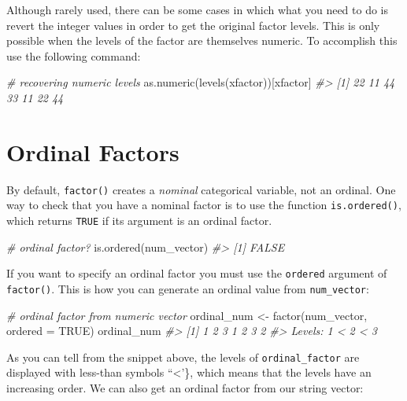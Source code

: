 \documentclass[
]{book}
\newenvironment{Shaded}{\begin{snugshade}}{\end{snugshade}}
\newcommand{\AttributeTok}[1]{\textcolor[rgb]{0.77,0.63,0.00}{#1}}
\newcommand{\CommentTok}[1]{\textcolor[rgb]{0.56,0.35,0.01}{\textit{#1}}}
\newcommand{\ConstantTok}[1]{\textcolor[rgb]{0.00,0.00,0.00}{#1}}
\newcommand{\FunctionTok}[1]{\textcolor[rgb]{0.00,0.00,0.00}{#1}}
\newcommand{\NormalTok}[1]{#1}
\newcommand{\OtherTok}[1]{\textcolor[rgb]{0.56,0.35,0.01}{#1}}
\begin{document}
Although rarely used, there can be some cases in which what you need to do is
revert the integer values in order to get the original factor levels. This is
only possible when the levels of the factor are themselves numeric. To accomplish
this use the following command:

\begin{Shaded}
\begin{Highlighting}[]
\CommentTok{\# recovering numeric levels}
\FunctionTok{as.numeric}\NormalTok{(}\FunctionTok{levels}\NormalTok{(xfactor))[xfactor]}
\CommentTok{\#\textgreater{} [1] 22 11 44 33 11 22 44}
\end{Highlighting}
\end{Shaded}

\hypertarget{ordinal-factors}{%
\section{Ordinal Factors}\label{ordinal-factors}}

By default, \texttt{factor()} creates a \emph{nominal} categorical variable, not an ordinal.
One way to check that you have a nominal factor is to use the function
\texttt{is.ordered()}, which returns \texttt{TRUE} if its argument is an ordinal factor.

\begin{Shaded}
\begin{Highlighting}[]
\CommentTok{\# ordinal factor?}
\FunctionTok{is.ordered}\NormalTok{(num\_vector)}
\CommentTok{\#\textgreater{} [1] FALSE}
\end{Highlighting}
\end{Shaded}

If you want to specify an ordinal factor you must use the \texttt{ordered} argument of
\texttt{factor()}. This is how you can generate an ordinal value from \texttt{num\_vector}:

\begin{Shaded}
\begin{Highlighting}[]
\CommentTok{\# ordinal factor from numeric vector}
\NormalTok{ordinal\_num }\OtherTok{\textless{}{-}} \FunctionTok{factor}\NormalTok{(num\_vector, }\AttributeTok{ordered =} \ConstantTok{TRUE}\NormalTok{)}
\NormalTok{ordinal\_num}
\CommentTok{\#\textgreater{} [1] 1 2 3 1 2 3 2}
\CommentTok{\#\textgreater{} Levels: 1 \textless{} 2 \textless{} 3}
\end{Highlighting}
\end{Shaded}

As you can tell from the snippet above, the levels of \texttt{ordinal\_factor} are
displayed with less-than symbols ``\textless{}'\}, which means that the levels have an
increasing order. We can also get an ordinal factor from our string vector:
\end{document}
